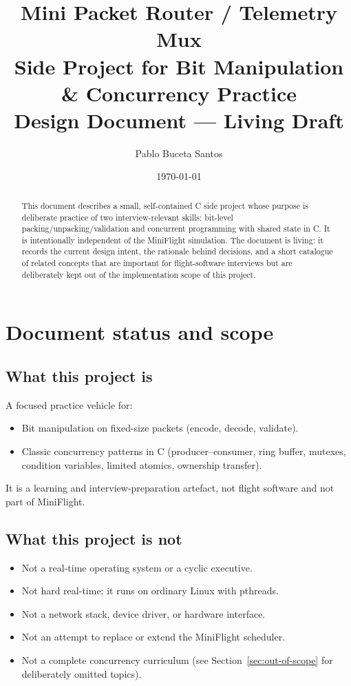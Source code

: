 \documentclass[11pt,a4paper]{article}
\title{%
    \vspace{-1cm}
    \textbf{Mini Packet Router / Telemetry Mux}\\[0.35em]
    \Large Side Project for Bit Manipulation \& Concurrency Practice\\[0.4em]
    \large Design Document --- Living Draft
}
\author{Pablo Buceta Santos}
\date{\today}
\begin{document}
\maketitle

\begin{abstract}
This document describes a small, self-contained C side project whose purpose is deliberate practice of two interview-relevant skills: bit-level packing/unpacking/validation and concurrent programming with shared state in C.
It is intentionally independent of the MiniFlight simulation.
The document is living: it records the current design intent, the rationale behind decisions, and a short catalogue of related concepts that are important for flight-software interviews but are deliberately kept out of the implementation scope of this project.
\end{abstract}

\tableofcontents
\newpage

\section{Document status and scope}
\label{sec:scope}

\subsection{What this project is}

A focused practice vehicle for:
\begin{itemize}[leftmargin=*]
    \item Bit manipulation on fixed-size packets (encode, decode, validate).
    \item Classic concurrency patterns in C (producer--consumer, ring buffer, mutexes, condition variables, limited atomics, ownership transfer).
\end{itemize}

It is a learning and interview-preparation artefact, not flight software and not part of MiniFlight.

\subsection{What this project is not}

\begin{itemize}[leftmargin=*]
    \item Not a real-time operating system or a cyclic executive.
    \item Not hard real-time; it runs on ordinary Linux with pthreads.
    \item Not a network stack, device driver, or hardware interface.
    \item Not an attempt to replace or extend the MiniFlight scheduler.
    \item Not a complete concurrency curriculum (see Section~\ref{sec:out-of-scope} for deliberately omitted topics).
\end{itemize}
\end{document}
